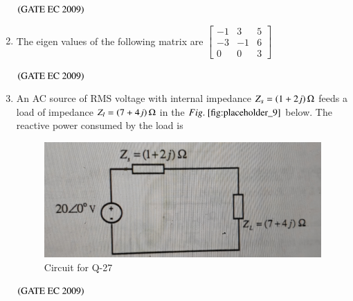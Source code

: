 \documentclass[journal,12pt,onecolumn]{IEEEtran}
\theoremstyle{remark}
\begin{document}
\begin{enumerate}[start=1, label={Q\arabic*.}]
\begin{enumerate}
\end{enumerate}
\hfill $\left(\text{GATE EC 2009}\right)$

\item The eigen values of the following matrix are 
$
\begin{bmatrix}
    -1 &3&5\\
    -3&-1&6\\
    0&0&3
\end{bmatrix}
$

\begin{enumerate}
\end{enumerate}
\hfill $\left(\text{GATE EC 2009}\right)$

\item An AC source of RMS voltage with internal impedance $Z_s = \left(1+2j\right) \ohm$ feeds a load of impedance $Z_l = \left(7+4j\right) \ohm$ in the $\figref{fig:placeholder_9}$ below. The reactive power consumed by the load is 
\begin{figure}[H]
    \centering
    \includegraphics[width=0.5\columnwidth]{figs/img_9.jpg}
    \caption{Circuit for Q-27}
    \label{fig:placeholder_9}
\end{figure}
\begin{enumerate}
\end{enumerate}
\hfill $\left(\text{GATE EC 2009}\right)$


\end{enumerate}
\end{document}

